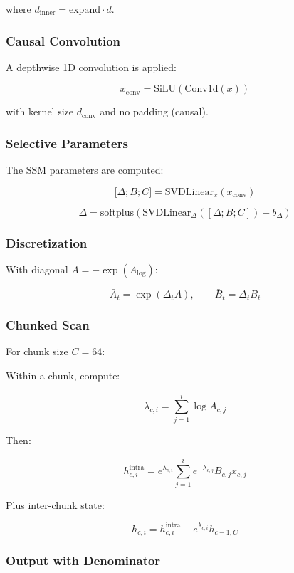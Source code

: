 where $d_\text{inner} = \text{expand} \cdot d$.

\subsubsection{Causal Convolution}

A depthwise 1D convolution is applied:

\[
x_\text{conv} = \text{SiLU}(\text{Conv1d}(x))
\tag{4.8}
\]

with kernel size $d_\text{conv}$ and no padding (causal).

\subsubsection{Selective Parameters}

The SSM parameters are computed:

\[
{[}\Delta; B; C] = \text{SVDLinear}_{x}(x_\text{conv})
\tag{4.9}
\]

\[
\Delta = \text{softplus}(\text{SVDLinear}_{\Delta}([\Delta; B; C]) + b_\Delta)
\tag{4.10}
\]

\subsubsection{Discretization}

With diagonal $A = -\exp(A_\text{log})$:

\[
\bar{A}_t = \exp(\Delta_t A), \qquad
\bar{B}_t = \Delta_t B_t
\tag{4.11}
\]

\subsubsection{Chunked Scan}

For chunk size $C = 64$:

Within a chunk, compute:

\[
\lambda_{c, i} = \sum_{j=1}^i \log \bar{A}_{c, j}
\tag{4.12}
\]

Then:

\[
h_{c, i}^\text{intra} = e^{\lambda_{c, i}} \sum_{j=1}^i e^{-\lambda_{c, j}} \bar{B}_{c, j} x_{c, j}
\tag{4.13}
\]

Plus inter-chunk state:

\[
h_{c, i} = h_{c, i}^\text{intra} + e^{\lambda_{c, i}} h_{c-1, C}
\tag{4.14}
\]

\subsubsection{Output with Denominator}

